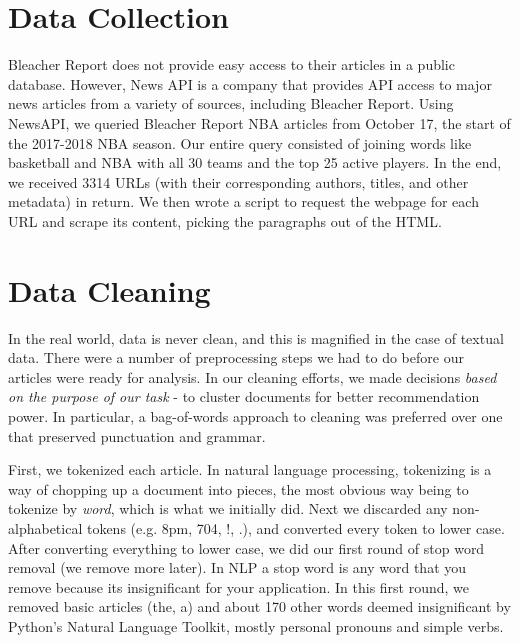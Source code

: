 \documentclass[11pt]{article}
\begin{document}
\section{Data Collection}
Bleacher Report does not provide easy access to their articles in a public database.  However, News API is a company that provides API access to major news articles from a variety of sources, including Bleacher Report.  Using NewsAPI, we queried Bleacher Report NBA articles from October 17, the start of the 2017-2018 NBA season. Our entire query consisted of joining words like basketball and NBA with all 30 teams and the top 25 active players.  In the end, we received 3314 URLs (with their corresponding authors, titles, and other metadata) in return.  We then wrote a script to request the webpage for each URL and scrape its content, picking the paragraphs out of the HTML.

\section{Data Cleaning}
In the real world, data is never clean, and this is magnified in the case of textual data. There were a number of preprocessing steps we had to do before our articles were ready for analysis. In our cleaning efforts, we made decisions \textit{based on the purpose of our task} - to cluster documents for better recommendation power.  In particular, a bag-of-words approach to cleaning was preferred over one that preserved punctuation and grammar. 

First, we tokenized each article. In natural language processing, tokenizing is a way of chopping up a document into pieces, the most obvious way being to tokenize by \textit{word}, which is what we initially did.  Next we discarded any non-alphabetical tokens (e.g. 8pm, 704, !, .), and converted every token to lower case.  After converting everything to lower case, we did our first round of stop word removal (we remove more later).  In  NLP a stop word is any word that you remove because its insignificant for your application. In this first round, we removed basic articles (the, a) and about 170 other words deemed insignificant by Python's Natural Language Toolkit, mostly personal pronouns and simple verbs.
\end{document}
